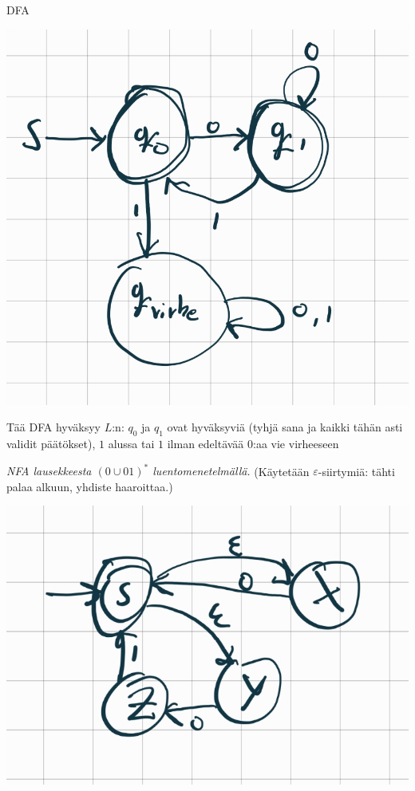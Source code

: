 \documentclass[12pt,a4paper]{article}
\begin{document}
\begin{kohta}
\item DFA

\begin{center}
  \includegraphics[width=.4\textwidth]{viikko4tehtävä2_1.jpg}
\end{center}

\smallskip
Tää DFA hyväksyy $L$:n: $q_0$ ja $q_1$ ovat hyväksyviä (tyhjä sana ja
kaikki tähän asti validit päätökset), $1$ alussa tai $1$ ilman edeltävää $0$:aa
vie virheeseen

\item \emph{NFA lausekkeesta \((0\cup 01)^*\) luentomenetelmällä.}
(Käytetään $\varepsilon$-siirtymiä: tähti palaa alkuun, yhdiste haaroittaa.)

\begin{center}
  \includegraphics[width=.4\textwidth]{viikko4tehtävä2_2.jpg}
\end{center}

\end{kohta}
\end{document}
